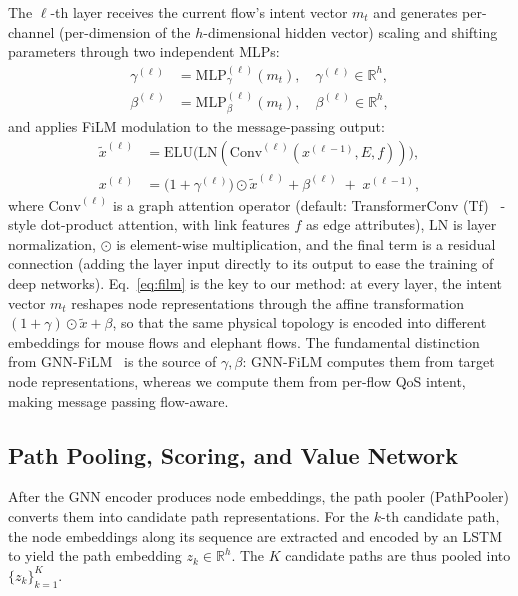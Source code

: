 The $\ell$-th layer receives the current flow's intent vector $m_t$ and generates per-channel (per-dimension of the $h$-dimensional hidden vector) scaling and shifting parameters through two independent MLPs:
\begin{align}
\gamma^{(\ell)} &= \mathrm{MLP}^{(\ell)}_{\gamma}(m_t), \quad \gamma^{(\ell)}\in\mathbb{R}^{h},
\label{eq:film_gamma}\\
\beta^{(\ell)} &= \mathrm{MLP}^{(\ell)}_{\beta}(m_t), \quad \beta^{(\ell)}\in\mathbb{R}^{h},
\label{eq:film_beta}
\end{align}
and applies FiLM modulation to the message-passing output:
\begin{align}
\tilde x^{(\ell)} &= \mathrm{ELU}\!\big(\mathrm{LN}(\mathrm{Conv}^{(\ell)}(x^{(\ell-1)}, E, f))\big),
\label{eq:conv}\\
x^{(\ell)} &= \big(1+\gamma^{(\ell)}\big)\odot \tilde x^{(\ell)} + \beta^{(\ell)} \;+\; x^{(\ell-1)},
\label{eq:film}
\end{align}
where $\mathrm{Conv}^{(\ell)}$ is a graph attention operator (default: TransformerConv (Tf)~\cite{Shi2021_UniMP}
-style dot-product attention, with link features $f$ as edge attributes), $\mathrm{LN}$ is layer normalization, $\odot$ is element-wise multiplication, and the final term is a residual connection (adding the layer input directly to its output to ease the training of deep networks). Eq.~\eqref{eq:film} is the key to our method: at every layer, the intent vector $m_t$ reshapes node representations through the affine transformation $(1+\gamma)\odot\tilde x+\beta$, so that the same physical topology is encoded into different embeddings for mouse flows and elephant flows. The fundamental distinction from GNN-FiLM~\cite{Brockschmidt2020_GNNFiLM} is the source of $\gamma,\beta$: GNN-FiLM computes them from target node representations, whereas we compute them from per-flow QoS intent, making 
message passing flow-aware.

\subsection{Path Pooling, Scoring, and Value Network}
\label{sec:method:scorer}

After the GNN encoder produces node embeddings, the path pooler (PathPooler) 
converts them into candidate path representations. For the $k$-th candidate path, the node embeddings along its sequence are extracted and encoded by an LSTM to yield the path embedding $z_k\in\mathbb{R}^{h}$. The $K$ candidate paths are thus pooled into $\{z_k\}_{k=1}^{K}$.

